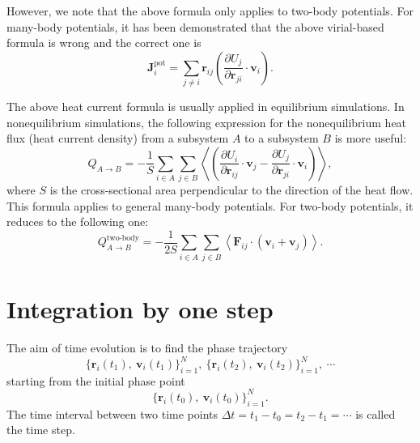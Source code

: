 \documentclass[12pt,a4paper]{report}
\newcommand{\vect}[1]{\boldsymbol{#1}}
\begin{document}
However, we note that the above formula only applies to two-body potentials. For many-body potentials, it has been demonstrated \cite{fan2015prb} that the above virial-based formula is wrong and the correct one is
\begin{equation}
\boxed{
\vect{J}^{\text{pot}}_i = \sum_{j \neq i} \vect{r}_{ij}
 \left(
 \frac{ \partial U_j} {\partial \vect{r}_{ji}} \cdot \vect{v}_i
 \right)}.
\end{equation}



The above heat current formula is usually applied in equilibrium simulations. In nonequilibrium simulations, the following expression for the nonequilibrium heat flux (heat current density) \cite{fan2017prb} from a subsystem $A$ to a subsystem $B$ is more useful:
\begin{equation}
\label{equation:Q_AB}
\boxed{
Q_{A \rightarrow B} = - \frac{1}{S} \sum_{i \in A} \sum_{j \in B}
\left\langle
\left(\frac{\partial U_i}{\partial \vect{r}_{ij}} \cdot \vect{v}_j
-\frac{\partial U_j}{\partial \vect{r}_{ji}} \cdot \vect{v}_i\right)
\right\rangle
},
\end{equation}
where $S$ is the cross-sectional area perpendicular to the direction of the heat flow.
This formula applies to general many-body potentials. For two-body potentials, it reduces to the following one:
\begin{equation}
  Q_{A \rightarrow B}^{\text{two-body}} =
- \frac{1}{2S} \sum_{i \in A} \sum_{j \in B}
\left\langle \vect{F}_{ij} \cdot (\vect{v}_i + \vect{v}_j) \right\rangle.
\end{equation}



\section{Integration by one step}

The aim of time evolution is to find the phase trajectory
\begin{equation}
\{ \vect{r}_i(t_1), ~\vect{v}_{i}(t_1)\}_{i=1}^N,~
\{ \vect{r}_i(t_2), ~\vect{v}_{i}(t_2)\}_{i=1}^N,~
\cdots
\end{equation}
starting from the initial phase point
\begin{equation}
\{ \vect{r}_i(t_0), ~\vect{v}_{i}(t_0)\}_{i=1}^N.
\end{equation}
The time interval between two time points $\Delta t=t_1-t_0=t_2-t_1=\cdots$ is called the time step.
\end{document}
